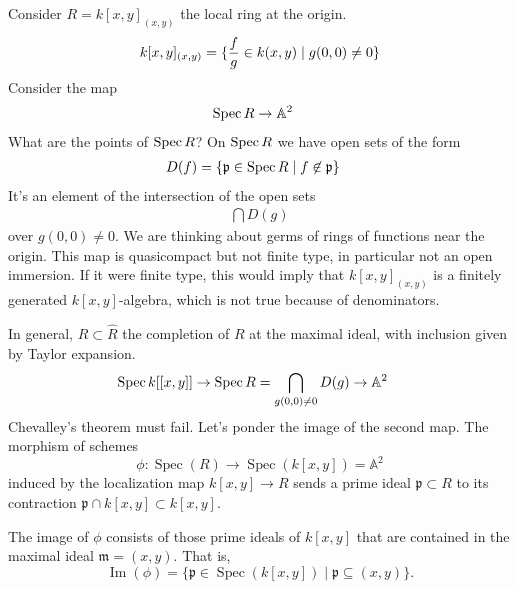 \documentclass[12pt]{article}
\begin{document}
\begin{example}
    Consider $R = k[x,y]_{(x,y)}$ the local ring at the origin. \begin{align*}
        k[x,y]_{(x,y)} &= \{\frac{f}{g} \in k(x,y) \mid g(0,0) \neq 0\} \\
    \end{align*} Consider the map \begin{align*}
        \operatorname{Spec} R &\to \mathbb{A}^2
    \end{align*}  What are the points of $\operatorname{Spec} R$? On $\operatorname{Spec} R$ we have open sets of the form \begin{align*}
        D(f) &= \{\mathfrak{p} \in \operatorname{Spec} R \mid f\not \in \mathfrak{p} \}
    \end{align*}
    It's an element of the intersection of the open sets \begin{align*}
        \bigcap D(g)
    \end{align*} over $g(0,0) \neq 0$. We are thinking about germs of rings of functions near the origin.
    This map is quasicompact but not finite type, in particular not an open immersion. If it were finite type, this would imply that $k[x,y]_{(x,y)}$ is a finitely generated $k[x,y]$-algebra, which is not true because of denominators.

    In general, $R \subset \hat R$ the completion of $R$ at the maximal ideal, with inclusion given by Taylor expansion.  \begin{align*}
        \operatorname{Spec} k[[x,y]] &\to \operatorname{Spec} R = \bigcap_{g(0,0)\neq 0} D(g) \to \mathbb{A}^2
    \end{align*}
    Chevalley's theorem must fail. Let's ponder the image of the second map. The morphism of schemes
    \[
    \phi: \operatorname{Spec}(R) \to \operatorname{Spec}(k[x, y]) = \mathbb{A}^2
    \]
    induced by the localization map \( k[x, y] \to R \) sends a prime ideal \( \mathfrak{p} \subset R \) to its contraction \( \mathfrak{p} \cap k[x, y] \subset k[x, y] \).
    
    The image of \( \phi \) consists of those prime ideals of \( k[x, y] \) that are contained in the maximal ideal \( \mathfrak{m} = (x, y) \). That is,
    \[
    \operatorname{Im}(\phi) = \{ \mathfrak{p} \in \operatorname{Spec}(k[x, y]) \mid \mathfrak{p} \subseteq (x, y) \}.
    \]
    

\end{example}
\end{document}
